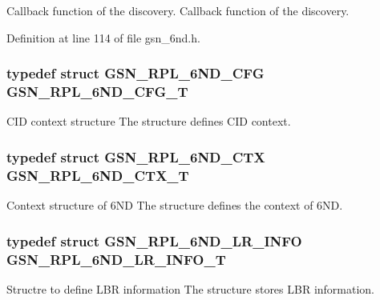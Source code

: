 Callback function of the discovery. Callback function of the discovery. 



Definition at line 114 of file gsn\_\-6nd.h.

\hypertarget{a00473_ae351fbf6827da8b8fd0868f9d5c54824}{
\subsubsection[{GSN\_\-RPL\_\-6ND\_\-CFG\_\-T}]{\setlength{\rightskip}{0pt plus 5cm}typedef struct {\bf GSN\_\-RPL\_\-6ND\_\-CFG} {\bf GSN\_\-RPL\_\-6ND\_\-CFG\_\-T}}}
\label{a00473_ae351fbf6827da8b8fd0868f9d5c54824}


CID context structure The structure defines CID context. 

\hypertarget{a00473_a92caa5dd3cd354266378c3d7178a3423}{
\subsubsection[{GSN\_\-RPL\_\-6ND\_\-CTX\_\-T}]{\setlength{\rightskip}{0pt plus 5cm}typedef struct {\bf GSN\_\-RPL\_\-6ND\_\-CTX} {\bf GSN\_\-RPL\_\-6ND\_\-CTX\_\-T}}}
\label{a00473_a92caa5dd3cd354266378c3d7178a3423}


Context structure of 6ND The structure defines the context of 6ND. 

\hypertarget{a00473_ae43655f56bf62bb2377a1a61dce9aa8d}{
\subsubsection[{GSN\_\-RPL\_\-6ND\_\-LR\_\-INFO\_\-T}]{\setlength{\rightskip}{0pt plus 5cm}typedef struct {\bf GSN\_\-RPL\_\-6ND\_\-LR\_\-INFO} {\bf GSN\_\-RPL\_\-6ND\_\-LR\_\-INFO\_\-T}}}
\label{a00473_ae43655f56bf62bb2377a1a61dce9aa8d}


Structre to define LBR information The structure stores LBR information. 

